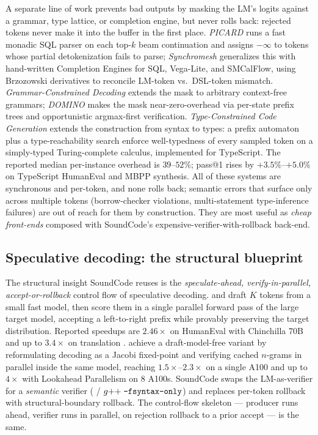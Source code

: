 A separate line of work prevents bad outputs by masking the LM's
logits against a grammar, type lattice, or completion engine, but
never rolls back: rejected tokens never make it into the buffer in
the first place. \emph{PICARD} \citep{scholak2021picard} runs a
fast monadic SQL parser on each top-$k$ beam continuation and
assigns $-\infty$ to tokens whose partial detokenization fails to
parse; \emph{Synchromesh} \citep{poesia2022synchromesh} generalizes
this with hand-written Completion Engines for SQL, Vega-Lite, and
SMCalFlow, using Brzozowski derivatives to reconcile LM-token vs.\
DSL-token mismatch. \emph{Grammar-Constrained Decoding}
\citep{geng2023gcd} extends the mask to arbitrary
context-free grammars; \emph{DOMINO} \citep{beurerkellner2024domino}
makes the mask near-zero-overhead via per-state prefix trees and
opportunistic argmax-first verification.
\emph{Type-Constrained Code Generation}
\citep{mundler2025typeconstrained} extends the construction from
syntax to types: a prefix automaton plus a type-reachability search
enforce well-typedness of every sampled token on a simply-typed
Turing-complete calculus, implemented for TypeScript. The reported
median per-instance overhead is $39$--$52\%$; pass@1 rises by
$+3.5\%$--$+5.0\%$ on TypeScript HumanEval and MBPP synthesis.
All of these systems are synchronous and per-token, and none rolls
back; semantic errors that surface only across multiple tokens
(borrow-checker violations, multi-statement type-inference failures)
are out of reach for them by construction. They are most useful as
\emph{cheap front-ends} composed with SoundCode's
expensive-verifier-with-rollback back-end.

\subsection{Speculative decoding: the structural blueprint}\label{sec:rw-spec}

The structural insight SoundCode reuses is the
\emph{speculate-ahead, verify-in-parallel, accept-or-rollback}
control flow of speculative decoding. \citet{leviathan2023speculative}
and \citet{chen2023speculative} draft $K$ tokens from a small fast
model, then score them in a single parallel forward pass of the
large target model, accepting a left-to-right prefix while
provably preserving the target distribution. Reported speedups are
$2.46\times$ on HumanEval with Chinchilla 70B
\citep{chen2023speculative} and up to $3.4\times$ on translation
\citep{leviathan2023speculative}. \citet{fu2024lookahead} achieve a
draft-model-free variant by reformulating decoding as a Jacobi
fixed-point and verifying cached $n$-grams in parallel inside the
same model, reaching $1.5\times$--$2.3\times$ on a single A100 and
up to $4\times$ with Lookahead Parallelism on 8 A100s.
SoundCode swaps the LM-as-verifier for a \emph{semantic} verifier
(\code{cargo check} / $g{+}{+}\;\texttt{-fsyntax-only}$) and replaces
per-token rollback with structural-boundary rollback. The control-flow skeleton --- producer
runs ahead, verifier runs in parallel, on rejection rollback to a
prior accept --- is the same.

